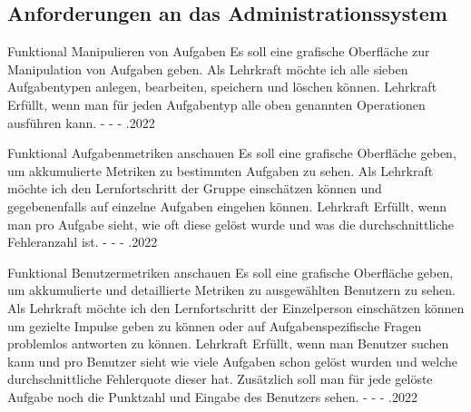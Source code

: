 \subsection{Anforderungen an das Administrationssystem}
\begin{myreq}
  \threeinline
    {}
    {\reqtype Funktional}
    {\reqevent Manipulieren von Aufgaben}
  \reqdesc Es soll eine grafische Oberfläche zur Manipulation von Aufgaben geben.
  \reqrat Als Lehrkraft möchte ich alle sieben Aufgabentypen anlegen, bearbeiten, speichern und löschen können.
  \reqorig Lehrkraft
  \reqfit Erfüllt, wenn man für jeden Aufgabentyp alle oben genannten Operationen ausführen kann.
  \twoinline
    {}
    {}
  \twoinline
  {\reqdep -}
  {\reqconf -}
  \reqmater -
  .2022
\end{myreq}

\begin{myreq}
  \threeinline
    {}
    {\reqtype Funktional}
    {\reqevent Aufgabenmetriken anschauen}
  \reqdesc Es soll eine grafische Oberfläche geben, um akkumulierte Metriken zu bestimmten Aufgaben zu sehen.
  \reqrat Als Lehrkraft möchte ich den Lernfortschritt der Gruppe einschätzen können und gegebenenfalls auf einzelne Aufgaben eingehen können.
  \reqorig Lehrkraft
  \reqfit Erfüllt, wenn man pro Aufgabe sieht, wie oft diese gelöst wurde und was die durchschnittliche Fehleranzahl ist.
  \twoinline
    {}
    {}
  \twoinline
  {\reqdep -}
  {\reqconf -}
  \reqmater -
  .2022
\end{myreq}

\begin{myreq}
  \threeinline
    {}
    {\reqtype Funktional}
    {\reqevent Benutzermetriken anschauen}
  \reqdesc Es soll eine grafische Oberfläche geben, um akkumulierte und detaillierte Metriken zu ausgewählten Benutzern zu sehen.
  \reqrat Als Lehrkraft möchte ich den Lernfortschritt der Einzelperson einschätzen können um gezielte Impulse geben zu können oder auf Aufgabenspezifische Fragen problemlos antworten zu können.
  \reqorig Lehrkraft
  \reqfit Erfüllt, wenn man Benutzer suchen kann und pro Benutzer sieht wie viele Aufgaben schon gelöst wurden und welche durchschnittliche Fehlerquote dieser hat. Zusätzlich soll man für jede gelöste Aufgabe noch die Punktzahl und Eingabe des Benutzers sehen.
  \twoinline
    {}
    {}
  \twoinline
  {\reqdep -}
  {\reqconf -}
  \reqmater -
  .2022
\end{myreq}

